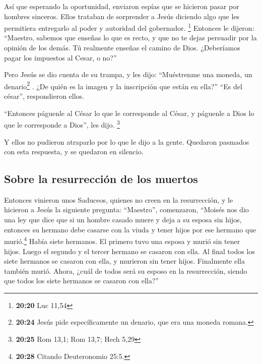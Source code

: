  Así que esperando la oportunidad, enviaron espías que se
hicieron pasar por hombres sinceros. Ellos trataban de sorprender a
Jesús diciendo algo que les permitiera entregarlo al poder y autoridad
del gobernador. \footnote{\textbf{20:20} Luc 11,54} 
Entonces le dijeron: ``Maestro, sabemos que enseñas lo que es recto, y
que no te dejas persuadir por la opinión de los demás. Tú realmente
enseñas el camino de Dios.  ¿Deberíamos pagar los
impuestos al Cesar, o no?''

 Pero Jesús se dio cuenta de su trampa, y les dijo:
 ``Muéstrenme una moneda, un denario\footnote{\textbf{20:24}
  Jesús pide específicamente un denario, que era una moneda romana.} .
¿De quién es la imagen y la inscripción que están en ella?'' ``Es del
césar'', respondieron ellos.

 ``Entonces páguenle al César lo que le corresponde al
César, y páguenle a Dios lo que le corresponde a Dios'', les dijo.
\footnote{\textbf{20:25} Rom 13,1; Rom 13,7; Hech 5,29}

 Y ellos no pudieron atraparlo por lo que le dijo a la
gente. Quedaron pasmados con esta respuesta, y se quedaron en silencio.

\hypertarget{sobre-la-resurrecciuxf3n-de-los-muertos}{%
\subsection{Sobre la resurrección de los
muertos}\label{sobre-la-resurrecciuxf3n-de-los-muertos}}

 Entonces vinieron unos Saduceos, quienes no creen en la
resurrección, y le hicieron a Jesús la siguiente pregunta:
 ``Maestro'', comenzaron, ``Moisés nos dio una ley que
dice que si un hombre casado muere y deja a su esposa sin hijos,
entonces su hermano debe casarse con la viuda y tener hijos por ese
hermano que murió.\footnote{\textbf{20:28} Citando Deuteronomio 25:5.}
 Había siete hermanos. El primero tuvo una esposa y murió
sin tener hijos.  Luego el segundo  y el
tercer hermano se casaron con ella. Al final todos los siete hermanos se
casaron con ella, y murieron sin tener hijos.  Finalmente
ella también murió.  Ahora, ¿cuál de todos será su esposo
en la resurrección, siendo que todos los siete hermanos se casaron con
ella?''

